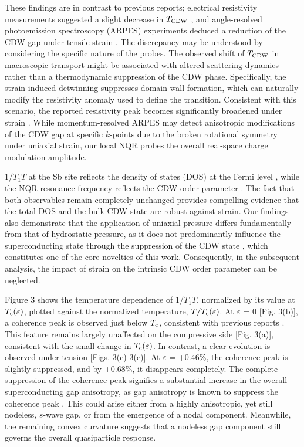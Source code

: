 \documentclass[aps,prl,twocolumn,superscriptaddress]{revtex4-2}
\begin{document}
These findings are in contrast to previous reports; electrical resistivity measurements suggested a slight decrease in $T_{\rm CDW}$ \cite{Qian_PRB}, and angle-resolved photoemission spectroscopy (ARPES) experiments deduced a reduction of the CDW gap under tensile strain \cite{ChangNatCom}. The discrepancy may be understood by considering the specific nature of the probes. The observed shift of $T_{\rm CDW}$ in macroscopic transport might be associated with altered scattering dynamics rather than a thermodynamic suppression of the CDW phase. Specifically, the strain-induced detwinning suppresses domain-wall formation, which can naturally modify the resistivity anomaly used to define the transition. Consistent with this scenario, the reported resistivity peak becomes significantly broadened under strain \cite{Qian_PRB}. While momentum-resolved ARPES may detect anisotropic modifications of the CDW gap at specific $k$-points due to the broken rotational symmetry under uniaxial strain, our local NQR probes the overall real-space charge modulation amplitude.



1/$T_1T$ at the Sb site reflects the density of states (DOS) at the Fermi level \cite{FengNPJ}, while the NQR resonance frequency reflects the CDW order parameter \cite{FengNPJ,LuoNPJ}. The fact that both observables remain completely unchanged provides compelling evidence that the total DOS and the bulk CDW state are robust against strain. Our findings also demonstrate that the application of uniaxial pressure differs fundamentally from that of hydrostatic pressure, as it does not predominantly influence the superconducting state through the suppression of the CDW state \cite{Chen_PRL,WuNature,FengNPJ,FengNatCom}, which constitutes one of the core novelties of this work. Consequently, in the subsequent analysis, the impact of strain on the intrinsic CDW order parameter can be neglected.





Figure 3 shows the temperature dependence of 1/$T_1T$, normalized by its value at $T_{\rm c}(\varepsilon)$, plotted against the normalized temperature, $T/T_{\rm c}(\varepsilon)$. At $\varepsilon$ = 0 [Fig. 3(b)], a coherence peak is observed just below $T_{\rm c}$, consistent with previous reports \cite{ZLi,WuNature,FengNatCom}. This feature remains largely unaffected on the compressive side [Fig. 3(a)], consistent with the small change in  $T_{\rm c}(\varepsilon)$. In contrast, a clear evolution is observed under tension [Figs. 3(c)-3(e)]. At $\varepsilon$ = +0.46\%, the coherence peak is slightly suppressed, and by +0.68\%, it disappears completely. The complete suppression of the coherence peak signifies a substantial increase in the overall superconducting gap anisotropy, as gap anisotropy is known to suppress the coherence peak \cite{MukudaCeRu2}. This could arise either from a highly anisotropic, yet still nodeless, $s$-wave gap, or from the emergence of a nodal component. Meanwhile, the remaining convex curvature suggests that a nodeless gap component still governs the overall quasiparticle response.
\end{document}
